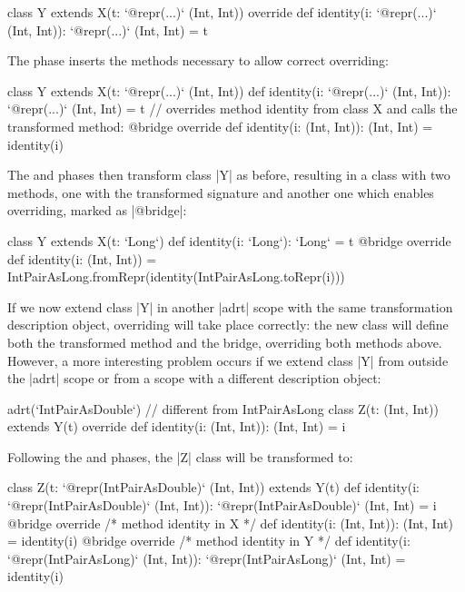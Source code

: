\begin{lstlisting-nobreak}
class Y extends X(t: `@repr(...)` (Int, Int)) {
  override def identity(i: `@repr(...)` (Int, Int)): `@repr(...)` (Int, Int) = t
}
\end{lstlisting-nobreak}

The \bridge{} phase inserts the methods necessary to allow correct overriding:

\begin{lstlisting-nobreak}
class Y extends X(t: `@repr(...)` (Int, Int)) {
  def identity(i: `@repr(...)` (Int, Int)): `@repr(...)` (Int, Int) = t
  // overrides method identity from class X and calls the transformed method:
  @bridge override def identity(i: (Int, Int)): (Int, Int) = identity(i)
}
\end{lstlisting-nobreak}

The \coerce{} and \commit{} phases then transform class |Y| as before, resulting in a class with two methods, one with the transformed signature and another one which enables overriding, marked as |@bridge|:

\begin{lstlisting-nobreak}
class Y extends X(t: `Long`) {
  def identity(i: `Long`): `Long` = t
  @bridge override def identity(i: (Int, Int)) =
    IntPairAsLong.fromRepr(identity(IntPairAsLong.toRepr(i)))
}
\end{lstlisting-nobreak}

If we now extend class |Y| in another |adrt| scope with the same transformation description object, overriding will take place correctly: the new class will define both the transformed method and the bridge, overriding both methods above. However, a more interesting problem occurs if we extend class |Y| from outside the |adrt| scope or from a scope with a different description object:

\begin{lstlisting-nobreak}
adrt(`IntPairAsDouble`) { // different from IntPairAsLong
  class Z(t: (Int, Int)) extends Y(t) {
    override def identity(i: (Int, Int)): (Int, Int) = i
  }
}
\end{lstlisting-nobreak}

Following the \inject{} and \bridge{} phases, the |Z| class will be transformed to:

\begin{lstlisting-nobreak}
class Z(t: `@repr(IntPairAsDouble)` (Int, Int)) extends Y(t) {
  def identity(i: `@repr(IntPairAsDouble)` (Int, Int)): `@repr(IntPairAsDouble)` (Int, Int) = i
  @bridge override /* method identity in X */
  def identity(i: (Int, Int)): (Int, Int) = identity(i)
  @bridge override /* method identity in Y */
  def identity(i: `@repr(IntPairAsLong)` (Int, Int)): `@repr(IntPairAsLong)` (Int, Int) = identity(i)
}
\end{lstlisting-nobreak}

